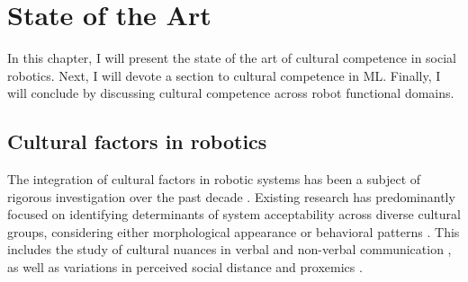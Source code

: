 
\chapter{State of the Art} 
\label{ch1:sec:sota}

\ifpdf
    \graphicspath{{State-Of-The-Art/Figs/Raster/}{State-Of-The-Art/Figs/PDF/}{State-Of-The-Art/Figs/}}
\else
    \graphicspath{{State-Of-The-Art/Figs/Vector/}{State-Of-The-Art/Figs/}}
\fi

In this chapter, I will present the state of the art of cultural competence in social robotics. Next, I will devote a section to cultural competence in ML. Finally, I will conclude by discussing cultural competence across robot functional domains.


\section{Cultural factors in robotics}

The integration of cultural factors in robotic systems has been a subject of rigorous investigation over the past decade \citep{Bartneck2007, Rehm2013}. 
Existing research has predominantly focused on identifying determinants of system acceptability across diverse cultural groups, considering either morphological appearance or behavioral patterns \citep{Shibata2009, Dingjun2010, Lee2016, vernon2024african, papadopoulos2022transcultural, recchiuto2019designing, akinade2023culturally, ornelas2023redefining, zantou2023culturally, Papadopoulos_CARESSES, battistuzzi2021socially, papadopoulos2020caresses, 8673086}. 
This includes the study of cultural nuances in verbal and non-verbal communication \citep{Rau2009, Andrist2015, Bruno2018, Rehm2018, CloudCultureDialogue, bruno2016fuzzy, chugh2024aisles, obremski2022impact, nias2020culturebot, recchiuto2020feasibility, GreetingSelection, pena2019eeva}, as well as variations in perceived social distance and proxemics \citep{Eresha2013, Joosse2014, Trovato2015, truong2016towards}.

